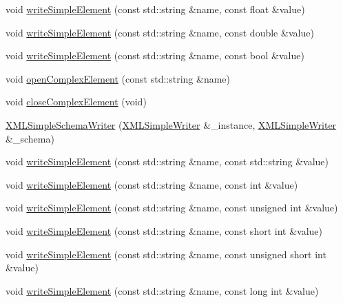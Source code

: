\begin{DoxyCompactItemize}
void \mbox{\hyperlink{classXMLWriterAPI_1_1XMLSimpleSchemaWriter_aea7726895cd925dac93eaad7c339a898}{write\+Simple\+Element}} (const std\+::string \&name, const float \&value)
\item 
void \mbox{\hyperlink{classXMLWriterAPI_1_1XMLSimpleSchemaWriter_adca0f83d1ac6848cdd95ad8b82ebcc1c}{write\+Simple\+Element}} (const std\+::string \&name, const double \&value)
\item 
void \mbox{\hyperlink{classXMLWriterAPI_1_1XMLSimpleSchemaWriter_aecd8faa2f1b2411dc108007c05bdb339}{write\+Simple\+Element}} (const std\+::string \&name, const bool \&value)
\item 
void \mbox{\hyperlink{classXMLWriterAPI_1_1XMLSimpleSchemaWriter_a136a57c1860b0baa0fd6b877f4dce4bc}{open\+Complex\+Element}} (const std\+::string \&name)
\item 
void \mbox{\hyperlink{classXMLWriterAPI_1_1XMLSimpleSchemaWriter_a48be6d4cbc08f03e9e76fa94107c4b8a}{close\+Complex\+Element}} (void)
\item 
\mbox{\hyperlink{classXMLWriterAPI_1_1XMLSimpleSchemaWriter_a309425b6927188991ba8fb9d19e0caca}{X\+M\+L\+Simple\+Schema\+Writer}} (\mbox{\hyperlink{classXMLWriterAPI_1_1XMLSimpleWriter}{X\+M\+L\+Simple\+Writer}} \&\+\_\+instance, \mbox{\hyperlink{classXMLWriterAPI_1_1XMLSimpleWriter}{X\+M\+L\+Simple\+Writer}} \&\+\_\+schema)
\item 
void \mbox{\hyperlink{classXMLWriterAPI_1_1XMLSimpleSchemaWriter_a312669330ac26b8849f671ea23ea60de}{write\+Simple\+Element}} (const std\+::string \&name, const std\+::string \&value)
\item 
void \mbox{\hyperlink{classXMLWriterAPI_1_1XMLSimpleSchemaWriter_a40db83e5cfb496535b89dae68eeea314}{write\+Simple\+Element}} (const std\+::string \&name, const int \&value)
\item 
void \mbox{\hyperlink{classXMLWriterAPI_1_1XMLSimpleSchemaWriter_a378d9bf2c78118d6a8e1bc934f96ef1d}{write\+Simple\+Element}} (const std\+::string \&name, const unsigned int \&value)
\item 
void \mbox{\hyperlink{classXMLWriterAPI_1_1XMLSimpleSchemaWriter_a915b7adc844a85019793c873e2184298}{write\+Simple\+Element}} (const std\+::string \&name, const short int \&value)
\item 
void \mbox{\hyperlink{classXMLWriterAPI_1_1XMLSimpleSchemaWriter_a9fe3e03577fa580736944c58c2019d6b}{write\+Simple\+Element}} (const std\+::string \&name, const unsigned short int \&value)
\item 
void \mbox{\hyperlink{classXMLWriterAPI_1_1XMLSimpleSchemaWriter_a96700920c4929deb5e7093188b187402}{write\+Simple\+Element}} (const std\+::string \&name, const long int \&value)

\end{DoxyCompactItemize}
